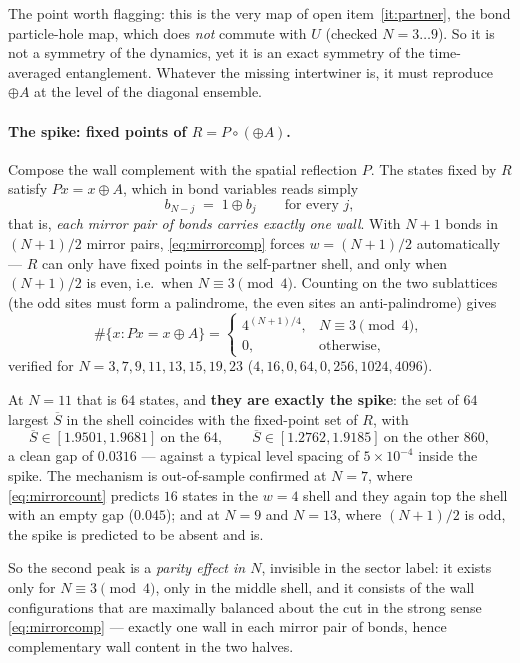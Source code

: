 \documentclass[11pt]{article}
\theoremstyle{plain}
\theoremstyle{definition}
\begin{document}
The point worth flagging: this is the very map of open item~\ref{it:partner},
the bond particle-hole map, which does \emph{not} commute with $U$ (checked
$N=3\ldots9$). So it is not a symmetry of the dynamics, yet it is an exact
symmetry of the time-averaged entanglement. Whatever the missing intertwiner is,
it must reproduce $\oplus A$ at the level of the diagonal ensemble.

\paragraph{The spike: fixed points of $R=P\circ(\oplus A)$.} Compose the wall
complement with the spatial reflection $P$. The states fixed by $R$ satisfy
$Px=x\oplus A$, which in bond variables reads simply
\begin{equation}
b_{N-j}\;=\;1\oplus b_j\qquad\text{for every }j,
\label{eq:mirrorcomp}
\end{equation}
that is, \emph{each mirror pair of bonds carries exactly one wall}. With $N+1$
bonds in $(N+1)/2$ mirror pairs, \eqref{eq:mirrorcomp} forces $w=(N+1)/2$
automatically --- $R$ can only have fixed points in the self-partner shell, and
only when $(N+1)/2$ is even, i.e.\ when $N\equiv3\pmod4$. Counting on the two
sublattices (the odd sites must form a palindrome, the even sites an
anti-palindrome) gives
\begin{equation}
\#\{x:Px=x\oplus A\}=
\begin{cases}4^{(N+1)/4}, & N\equiv3\pmod 4,\\[2pt] 0,&\text{otherwise,}\end{cases}
\label{eq:mirrorcount}
\end{equation}
verified for $N=3,7,9,11,13,15,19,23$ ($4,16,0,64,0,256,1024,4096$).

At $N=11$ that is $64$ states, and \textbf{they are exactly the spike}: the set
of $64$ largest $\overline{S}$ in the shell coincides with the fixed-point set of
$R$, with
\[
\overline{S}\in[1.9501,1.9681]\ \text{on the }64,\qquad
\overline{S}\in[1.2762,1.9185]\ \text{on the other }860,
\]
a clean gap of $0.0316$ --- against a typical level spacing of $5\times10^{-4}$
inside the spike. The mechanism is out-of-sample confirmed at $N=7$, where
\eqref{eq:mirrorcount} predicts $16$ states in the $w=4$ shell and they again top
the shell with an empty gap ($0.045$); and at $N=9$ and $N=13$, where
$(N+1)/2$ is odd, the spike is predicted to be absent and is.

So the second peak is a \emph{parity effect in $N$}, invisible in the sector
label: it exists only for $N\equiv3\pmod4$, only in the middle shell, and it
consists of the wall configurations that are maximally balanced about the cut in
the strong sense \eqref{eq:mirrorcomp} --- exactly one wall in each mirror pair
of bonds, hence complementary wall content in the two halves.
\end{document}
